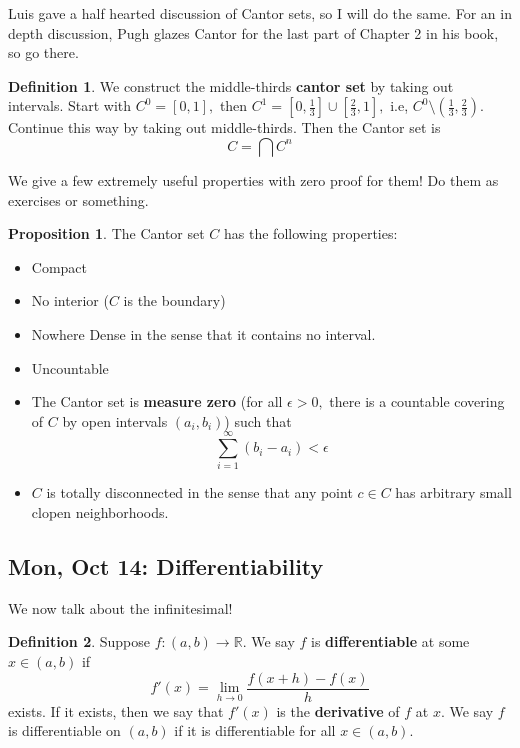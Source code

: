 \documentclass[10pt, oneside]{article}
\newcommand{\bbR}{\mathbb{R}}
\theoremstyle{definition}
\newtheorem{defn}{Definition}
\newtheorem{prop}{Proposition}
\begin{document}
Luis gave a half hearted discussion of Cantor sets, so I will do the same. For an in depth discussion, Pugh glazes Cantor for the last part of Chapter 2 in his book, so go there.

\begin{defn}
    We construct the middle-thirds \textbf{cantor set} by taking out intervals. Start with  $C^0 = [0,1],$ then $C^1 = [0,\frac{1}{3}] \cup [\frac{2}{3}, 1],$ i.e, $C^0 \setminus (\frac{1}{3}, \frac{2}{3}).$ Continue this way by taking out middle-thirds. Then the Cantor set is 
    \[C = \bigcap C^n\]
\end{defn}
We give a few extremely useful properties with zero proof for them! Do them as exercises or something.
\begin{prop}
The Cantor set $C$ has the following properties:
    \begin{itemize}
        \item Compact
        \item No interior ($C$ is the boundary)
        \item Nowhere Dense in the sense that it contains no interval.
        \item Uncountable
        \item The Cantor set is \textbf{measure zero} (for all $\epsilon>0,$ there is a countable covering of $C$ by open intervals $(a_i, b_i)$) such that 
        \[\sum_{i=1}^\infty (b_i - a_i)< \epsilon\]
        \item $C$ is totally disconnected in the sense that any point $c \in C$ has arbitrary small clopen neighborhoods.
    \end{itemize}
\end{prop}


\newpage
\subsection{Mon, Oct 14: Differentiability}
We now talk about the infinitesimal! 
\begin{defn}
    Suppose $f: (a,b)\to \bbR.$ We say $f$ is \textbf{differentiable} at some $x\in (a,b)$ if 
    \[f'(x) = \lim_{h\to 0}\frac{f(x + h) - f(x)}{h}\] exists. If it exists, then we say that $f'(x)$ is the \textbf{derivative} of $f$ at $x.$ We say $f$ is differentiable on $(a,b)$ if it is differentiable for all $x\in (a,b).$
\end{defn}
\end{document}

